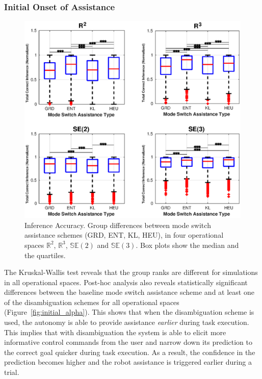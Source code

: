 \documentclass[letterpaper, 10 pt, conference]{ieeeconf}  %
\begin{document}
\subsubsection{Initial Onset of Assistance}
\begin{figure}[t!]
	\centering
	\includegraphics[width= 1.1\hsize, height=0.46\vsize, center]{./figures/correct_inference.eps}
	\vspace{-0.75cm}
	\caption{Inference Accuracy. Group differences between mode switch assistance schemes (GRD, ENT, KL, HEU), in four operational spaces $\mathbb{R}^2$, $\mathbb{R}^3$, $\mathbb{SE}(2)$ and $\mathbb{SE}(3)$. Box plots show the median and the quartiles.} 
	\label{fig:correct_inference}
\end{figure}

The Kruskal-Wallis test reveals that the group ranks are different for simulations in all operational spaces. Post-hoc analysis also reveals statistically significant differences between the baseline mode switch assistance scheme and at least one of the disambiguation schemes for all operational spaces (Figure~\ref{fig:initial_alpha}). This shows that when the disambiguation scheme is used, the autonomy is able to provide assistance \textit{earlier} during task execution. This implies that with disambiguation the system is able to elicit more informative control commands from the user and narrow down its prediction to the correct goal quicker during task execution. As a result, the confidence in the prediction becomes higher and the robot assistance is triggered earlier during a trial. 
\end{document}
